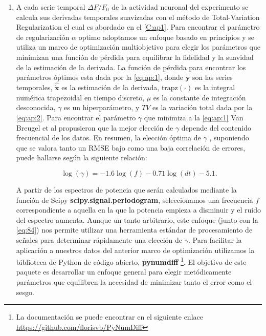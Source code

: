 \begin{enumerate}
	
	\item  A cada serie temporal $\Delta F/F_0$ de la actividad neuronal del experimento   se calcula sus derivadas temporales suavizadas con el método de Total-Variation Regularization  el cual es abordado en el \cref{C:ap1}. Para encontrar el parámetro de regularización  $\alpha$ optimo adoptamos un enfoque basado en principios y se utiliza un marco de optimización multiobjetivo para elegir los parámetros que minimizan una función de pérdida para equilibrar la fidelidad y la suavidad de la estimación de la derivada.  La función de pérdida para encontrar los parámetros óptimos esta dada por la \cref{eq:ap:1}, donde $\mathbf{y}$  son las series temporales, $\mathbf{\hat{\dot{x}}}$ es la estimación de la derivada,  $\text{trapz}(\cdot)$ es la integral numérica trapezoidal en tiempo discreto,  $\mu$	es la constante de integración desconocida,  $\gamma$ es un hiperparámetro, y  $TV$  es la variación total dada por la \cref{eq:ap:2}.  Para encontrar el parámetro $\gamma$ que minimiza a la \cref{eq:ap:1}   Van Breugel et al \cite{van_breugel_numerical_2020} propusieron que la mejor elección de $\gamma$ depende del contenido frecuencial de los datos. En resumen, la elección óptima de $\gamma$ , suponiendo que se valora tanto un RMSE bajo como una baja correlación de errores, puede hallarse según la siguiente relación: 
	
	
	\begin{equation}\label{eq:84}
		\log (\gamma) = -1.6\log (f) -0.71\log (dt) -5.1.
	\end{equation}
	
	A partir de los espectros de potencia que serán calculados mediante la función  de Scipy \textbf{scipy.signal.periodogram}, seleccionamos una frecuencia $f$ correspondiente a aquella en la que la potencia empieza a disminuir y el ruido del espectro aumenta. Aunque un tanto arbitrario, este enfoque (junto con la \cref{eq:84}) nos permite utilizar una herramienta estándar de procesamiento de señales para determinar rápidamente una elección de $\gamma$. Para facilitar la aplicación a nuestros datos del anterior marco de optimización utilizamos la biblioteca de Python de código abierto, \textbf{pynumdiff} \footnote{La documentación se puede encontrar en  el siguiente enlace \url{https://github.com/florisvb/PyNumDiff}}.  El  objetivo de este paquete es desarrollar un enfoque general para elegir metódicamente parámetros que equilibren la necesidad de minimizar tanto el error como el sesgo. 
	

\end{enumerate}

